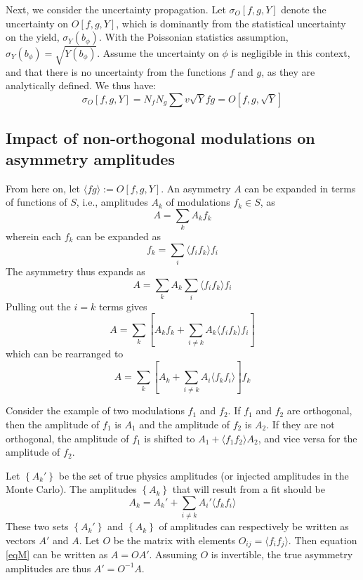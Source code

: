 \documentclass[12pt]{article}
\begin{document}
Next, we consider the uncertainty propagation. Let $\sigma_O[f,g,Y]$ denote the
uncertainty on $O[f,g,Y]$, which is dominantly from the statistical uncertainty
on the yield, $\sigma_Y(b_\phi)$. With the Poissonian statistics assumption,
$\sigma_Y(b_\phi)=\sqrt{Y(b_\phi)}$. Assume the uncertainty on $\phi$ is
negligible in this context, and that there is no uncertainty from the functions
$f$ and $g$, as they are analytically defined. We thus have:
\begin{equation}
\sigma_O[f,g,Y]=N_fN_g\sum{v\sqrt{Y}fg}=O\left[f,g,\sqrt{Y}\right]
\end{equation}


\subsection*{Impact of non-orthogonal modulations on asymmetry amplitudes}
From here on, let $\langle fg\rangle:=O[f,g,Y]$.
An asymmetry $A$ can be expanded in terms of functions of $S$, i.e., amplitudes
$A_k$ of modulations $f_k\in S$, as
\begin{equation}
A=\sum_k{A_kf_k}
\end{equation}
wherein each $f_k$ can be expanded as 
\begin{equation}
f_k=\sum_i{\langle f_if_k\rangle f_i}
\end{equation}
The asymmetry thus expands as
\begin{equation}
A=\sum_k{A_k\sum_i{\langle f_if_k\rangle f_i}}
\end{equation}
Pulling out the $i=k$ terms gives
\begin{equation}
A=\sum_k\left[A_kf_k+\sum_{i\neq k}{A_k\langle f_if_k\rangle f_i}
\right]
\end{equation}
which can be rearranged to
\begin{equation}
A=\sum_k\left[A_k+\sum_{i\neq k}{A_i\langle f_kf_i\rangle}
\right]f_k
\end{equation}

Consider the example of two modulations $f_1$ and $f_2$.
If $f_1$ and $f_2$ are orthogonal, then the amplitude of $f_1$ is $A_1$ and the
amplitude of $f_2$ is $A_2$.  If they are not orthogonal, 
the amplitude of $f_1$ is shifted to $A_1+\langle f_1f_2\rangle A_2$,
and vice versa for the amplitude of $f_2$.

Let $\left\{A_k'\right\}$ be the set of true physics amplitudes (or injected
amplitudes in the Monte Carlo).  The amplitudes $\left\{A_k\right\}$ that will result
from a fit should be 
\begin{equation}
A_k=A_k'+\sum_{i\neq k}{A_i'\langle f_kf_i\rangle}
\label{eqM}
\end{equation}
These two sets $\left\{A_k'\right\}$ and $\left\{A_k\right\}$ of amplitudes can
respectively be written as vectors $A'$ and $A$. Let $O$ be the matrix with
elements $O_{ij}=\langle f_if_j\rangle$. Then equation \ref{eqM} can be written
as $A=OA'$. Assuming $O$ is invertible, the true asymmetry amplitudes are thus
$A'=O^{-1}A$.
\end{document}
